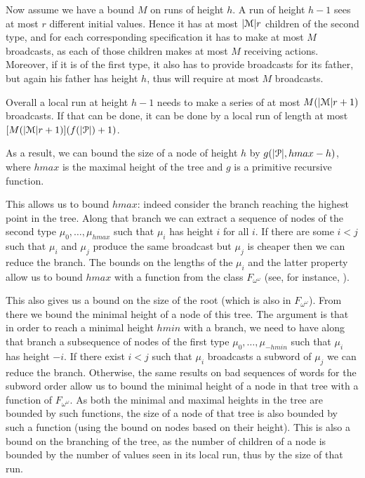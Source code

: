  Now assume we have a bound $M$ on runs of height $h$. A run of height $h-1$ sees at most $r$ different initial values. Hence it has at most $|\mathcal{M}|r$ children of the second type, and for each corresponding specification it has to make at most $M$ broadcasts, as each of those children makes at most $M$ receiving actions.
 Moreover, if it is of the first type, it also has to provide broadcasts for its father, but again his father has height $h$, thus will require at most $M$ broadcasts.
 
 Overall a local run at height $h-1$ needs to make a series of at most $M(|\mathcal{M}| r +1)$ broadcasts. If that can be done, it can be done by a local run of length at most $[M(|\mathcal{M}| r +1)](f(|\mathcal{P}|)+1)$.
 
 As a result, we can bound the size of a node of height $h$ by $g(|\mathcal{P}|, hmax-h)$, where $hmax$ is the maximal height of the tree and $g$ is a primitive recursive function.
 
 This allows us to bound $hmax$: indeed consider the branch reaching the highest point in the tree. Along that branch we can extract a sequence of nodes of the second type $\mu_0, \ldots, \mu_{hmax}$ such that $\mu_i$ has height $i$ for all $i$. If there are some $i<j$ such that $\mu_i$ and $\mu_j$ produce the same broadcast but $\mu_j$ is cheaper then we can reduce the branch.
 The bounds on the lengths of the $\mu_i$ and the latter property allow us to bound $hmax$ with a function from the class $F_{\omega^\omega}$ (see, for instance, \cite{schmitzS2011}).
 
 This also gives us a bound on the size of the root (which is also in $F_{\omega^\omega}$). From there we bound the minimal height of a node of this tree. The argument is that in order to reach a minimal height $hmin$ with a branch, we need to have along that branch a subsequence of nodes of the first type $\mu_0, \ldots, \mu_{-hmin}$ such that $\mu_i$ has height $-i$. If there exist $i<j$ such that $\mu_i$ broadcasts a subword of $\mu_j$ we can reduce the branch. Otherwise, the same results on bad sequences of words  for the subword order allow us to bound the minimal height of a node in that tree with a function of $F_{\omega^\omega}$.
 As both the minimal and maximal heights in the tree are bounded by such functions, the size of a node of that tree is also bounded by such a function (using the bound on nodes based on their height). This is also a bound on the branching of the tree, as the number of children of a node is bounded by the number of values seen in its local run, thus by the size of that run.
 
